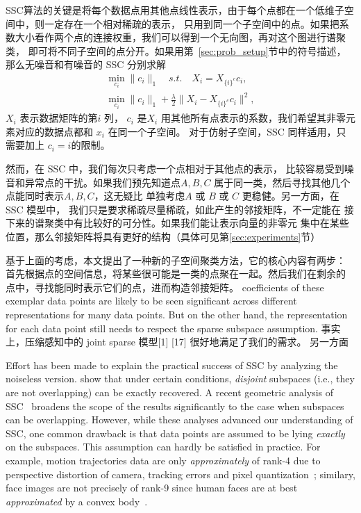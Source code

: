 \documentclass{ctexart}
\begin{document}
SSC算法的关键是将每个数据点用其他点线性表示，由于每个点都在一个低维子空间中，则一定存在一个相对稀疏的表示，
只用到同一个子空间中的点。如果把系数大小看作两个点的连接权重，我们可以得到一个无向图，再对这个图进行谱聚类，
即可将不同子空间的点分开。如果用第~\ref{sec:prob_setup}节中的符号描述，那么无噪音和有噪音的 SSC 分别求解
\begin{align*}
  \min_{c_i} \|c_i\|_1\quad s.t.\quad X_i=X_{\{i\}^c}c_i, \\
  \min_{c_i} \|c_i\|_1+\frac{\lambda}{2}\|X_i-X_{\{i\}^c}c_i\|^2,
\end{align*}
$X_i$ 表示数据矩阵的第$i$ 列， $c_i$ 是$X_i$ 用其他所有点表示的系数，我们希望其非零元素对应的数据点都和 $x_i$ 在同一个子空间。
对于仿射子空间，SSC 同样适用，只需要加上 $c_i = i$的限制。

然而，在 SSC 中，我们每次只考虑一个点相对于其他点的表示，
比较容易受到噪音和异常点的干扰。如果我们预先知道点$A,B,C$
属于同一类，然后寻找其他几个点能同时表示$A,B,C$，这无疑比
单独考虑$A$ 或 $B$ 或 $C$ 更稳健。另一方面，在SSC 模型中，
我们只是要求稀疏尽量稀疏，如此产生的邻接矩阵，不一定能在
接下来的谱聚类中有比较好的可分性。如果我们能让表示向量的非零元
集中在某些位置，那么邻接矩阵将具有更好的结构（具体可见第\ref{sec:experiments}节）

基于上面的考虑，本文提出了一种新的子空间聚类方法，它的核心内容有两步：
首先根据点的空间信息，将某些很可能是一类的点聚在一起。然后我们在剩余的
点中，寻找能同时表示它们的点，进而构造邻接矩阵。
coefficients of these exemplar data points are likely to be
seen significant across different representations for many
data points. But on the other hand, the representation for
each data point still needs to respect the sparse subspace
assumption. 事实上，压缩感知中的 joint sparse 模型[1]  [17] 很好地满足了我们的需求。
另一方面

Effort has been made to explain the practical success of SSC by analyzing the noiseless version. \cite{elhamifar2010ssc_icassp} show that under certain conditions, \emph{disjoint} subspaces (i.e., they are not overlapping) can be exactly recovered.
A recent geometric analysis of SSC~\cite{soltanolkotabi2011geometric} broadens the scope of the results significantly to the case when subspaces can be overlapping. However, while these analyses advanced our understanding of SSC, one common drawback
is that data points are assumed to be lying {\em exactly} on the subspaces. This assumption can hardly be satisfied in practice. For example, motion trajectories data are only {\em approximately} of rank-4 due to perspective distortion of camera, tracking errors and pixel quantization~\cite{costeira1998motion_seg}; similary, face images are   not precisely of rank-9 since human faces are at best {\em approximated} by a convex body~\cite{basri2003lambertianface}.
\end{document}
